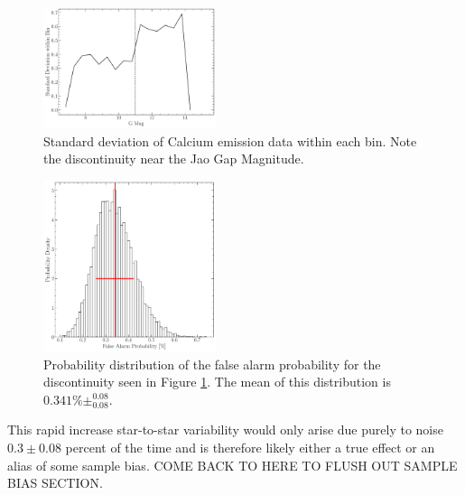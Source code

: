 \begin{figure}
  \centering
  \includegraphics[width=0.45\textwidth]{figures/jaoMagActivity/Deviation.pdf}
  \caption{Standard deviation of Calcium emission data within each bin. Note
  the discontinuity near the Jao Gap Magnitude.}
  \label{fig:deviation}
\end{figure}

\begin{figure}
  \centering
  \includegraphics[width=0.45\textwidth]{figures/jaoMagActivity/fpDist.pdf}
  \caption{Probability distribution of the false alarm probability for the
  discontinuity seen in Figure \ref{fig:deviation}. The mean of this
  distribution is $0.341\%\pm^{0.08}_{0.08}$.}
  \label{fig:dist}
\end{figure}

This rapid increase star-to-star variability would only arise due purely to
noise $0.3\pm0.08$ percent of the time and is therefore likely either a true
effect or an alias of some sample bias. {\color{red} COME BACK TO HERE TO FLUSH
OUT SAMPLE BIAS SECTION.}

